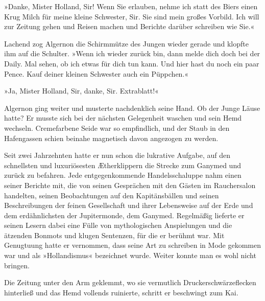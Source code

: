 »Danke, Mister Holland, Sir! Wenn Sie erlauben, nehme ich statt des
Biers einen Krug Milch für meine kleine Schwester, Sir. Sie sind
mein großes Vorbild. Ich will zur Zeitung gehen und Reisen machen
und Berichte darüber schreiben wie Sie.«

Lachend zog Algernon die Schirmmütze des Jungen wieder gerade und
klopfte ihm auf die Schulter. »Wenn ich wieder zurück bin, dann
melde dich doch bei der Daily. Mal sehen, ob ich etwas für dich tun
kann. Und hier hast du noch ein paar Pence. Kauf deiner kleinen
Schwester auch ein Püppchen.«

»Ja, Mister Holland, Sir, danke, Sir. Extrablatt!«

\bigpar

Algernon ging weiter und musterte nachdenklich seine Hand. Ob der
Junge Läuse hatte? Er musste sich bei der nächsten Gelegenheit
waschen und sein Hemd wechseln. Cremefarbene Seide war so
empfindlich, und der Staub in den Hafengassen schien beinahe
magnetisch davon angezogen zu werden.

Seit zwei Jahrzehnten hatte er nun schon die lukrative Aufgabe, auf
den schnellsten und luxuriösesten Ætherklippern die Strecke zum
Ganymed und zurück zu befahren. Jede entgegenkommende
Handelsschaluppe nahm einen seiner Berichte mit, die von seinen
Gesprächen mit den Gästen im Rauchersalon handelten, seinen
Beobachtungen auf den Kapitänsbällen und seinen Beschreibungen der
feinen Gesellschaft und ihrer Lebensweise auf der Erde und dem
erdähnlichsten der Jupitermonde, dem Ganymed. Regelmäßig lieferte
er seinen Lesern dabei eine Fülle von mythologischen Anspielungen
und die ätzenden Bonmots und klugen Sentenzen, für die er berühmt
war. Mit Genugtuung hatte er vernommen, dass seine Art zu schreiben
in Mode gekommen war und als »Hollandismus« bezeichnet wurde.
Weiter konnte man es wohl nicht bringen.

\bigpar

Die Zeitung unter den Arm geklemmt, wo sie vermutlich
Druckerschwärzeflecken hinterließ und das Hemd vollends ruinierte,
schritt er beschwingt zum Kai.

\bigpar

